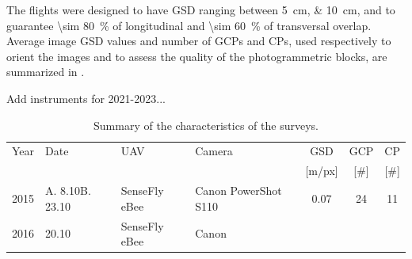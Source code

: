The flights were designed to have GSD ranging between \qtylist{5;10}{\centi\meter}, and
to guarantee \qty{\sim 80}{\percent} of longitudinal and \qty{\sim 60}{\percent} of
transversal overlap.
Average image GSD values and number of GCPs and CPs, used respectively to orient the
images and to assess the quality of the photogrammetric blocks, are summarized in
.

{\color{red} Add instruments for 2021-2023...}

\begin{table}[p]
    \small
    \centering
    \caption{Summary of the characteristics of the surveys.}
    \begin{tabular}{c  m{1.8cm} m{3.5cm} m{4.2cm} c c c }
        \toprule
        Year                                                              & Date
                                                                          & UAV
                                                                          & Camera
                                                                          & GSD
                                                                          & GCP
                                                                          & CP
        \\
                                                                          &
                                                                          &
                                                                          &
                                                                          & [m/px]
                                                                          & [\#]
                                                                          & [\#]
        \\
        \midrule
        2015                                                              & A.
        8.10\newline B. 23.10                                             &
        SenseFly eBee                                                     & Canon
        PowerShot S110                                                    & 0.07
                                                                          & 24
                                                                          & 11
        \\[4mm]
        2016                                                              & 20.10
                                                                          & SenseFly eBee
                                                                          & Canon

\end{tabular}
\end{table}
